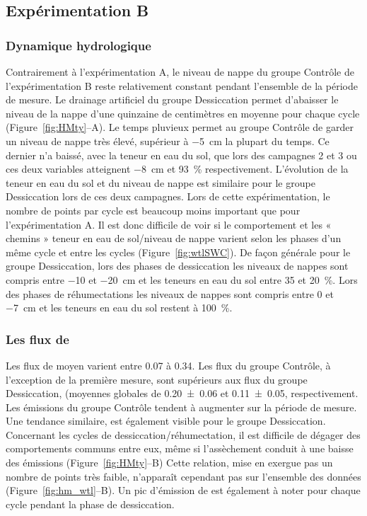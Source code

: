 \subsection{Expérimentation B}

\subsubsection{Dynamique hydrologique}

Contrairement à l'expérimentation A, le niveau de nappe du groupe Contrôle de l'expérimentation B reste relativement constant pendant l'ensemble de la période de mesure.
Le drainage artificiel du groupe Dessiccation permet d'abaisser le niveau de la nappe d'une quinzaine de centimètres en moyenne pour chaque cycle (Figure~\ref{fig:HMty}--A).
Le temps pluvieux permet au groupe Contrôle de garder un niveau de nappe très élevé, supérieur à \SI{-5}{\centi\metre} la plupart du temps.
Ce dernier n'a baissé, avec la teneur en eau du sol, que lors des campagnes 2 et 3 ou ces deux variables atteignent \SI{-8}{\centi\metre} et \SI{93}{\percent} respectivement.
L'évolution de la teneur en eau du sol et du niveau de nappe est similaire pour le groupe Dessiccation lors de ces deux campagnes.
Lors de cette expérimentation, le nombre de points par cycle est beaucoup moins important que pour l'expérimentation A.
Il est donc difficile de voir si le comportement et les « chemins » teneur en eau de sol/niveau de nappe varient selon les phases d'un même cycle et entre les cycles (Figure~\ref{fig:wtlSWC}).
De façon générale pour le groupe Dessiccation, lors des phases de dessiccation les niveaux de nappes sont compris entre \num{-10} et \SI{-20}{\centi\metre} et les teneurs en eau du sol entre 35 et \SI{20}{\percent}.
Lors des phases de réhumectations les niveaux de nappes sont compris entre \num{0} et \SI{-7}{\centi\metre} et les teneurs en eau du sol restent à \SI{100}{\percent}.


\subsubsection{Les flux de \chh}

Les flux de \chh moyen varient entre \num{0.07} à \SI{0.34}{\uml}.
Les flux du groupe Contrôle, à l'exception de la première mesure, sont supérieurs aux flux du groupe Dessiccation, (moyennes globales de \num{0.20(006)} et \SI{0.11(005)}{\uml}, respectivement.
Les émissions du groupe Contrôle tendent à augmenter sur la période de mesure.
Une tendance similaire, est également visible pour le groupe Dessiccation.
Concernant les cycles de dessiccation/réhumectation, il est difficile de dégager des comportements communs entre eux, même si l'assèchement conduit à une baisse des émissions (Figure~\ref{fig:HMty}--B)
Cette relation, mise en exergue pas un nombre de points très faible, n’apparaît cependant pas sur l'ensemble des données (Figure~\ref{fig:hm_wtl}--B).
Un pic d'émission de \chh est également à noter pour chaque cycle pendant la phase de dessiccation.

